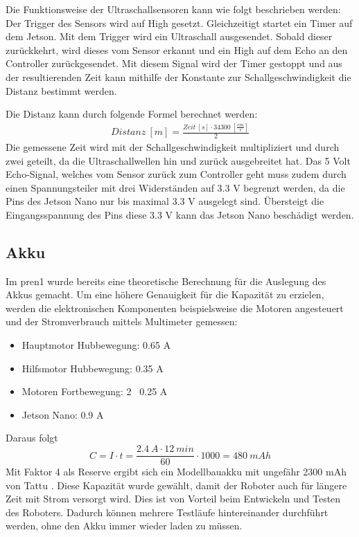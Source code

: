 Die Funktionsweise der Ultraschallsensoren kann wie folgt beschrieben werden:
Der Trigger des Sensors wird auf High gesetzt. Gleichzeitigt startet ein Timer auf dem Jetson. Mit dem Trigger wird ein Ultraschall ausgesendet. Sobald dieser zurückkehrt, wird dieses vom Sensor erkannt und ein High auf dem Echo an den Controller zurückgesendet. Mit diesem Signal wird der Timer gestoppt und aus der resultierenden Zeit kann mithilfe der Konstante zur Schallgeschwindigkeit die Distanz bestimmt werden.

Die Distanz kann durch folgende Formel berechnet werden:
\begin{align*}
    Distanz\ [m] = \frac{Zeit\ [s] \cdot 34300\ [\frac{cm}{s}]}{2}
\end{align*}
Die gemessene Zeit wird mit der Schallgeschwindigkeit multipliziert und durch zwei geteilt, da die Ultraschallwellen hin und zurück ausgebreitet hat. 
Das 5 Volt Echo-Signal, welches vom Sensor zurück zum Controller geht muss zudem durch einen Spannungsteiler mit drei Widerständen auf 3.3 V begrenzt werden, da die Pins des Jetson Nano nur bis maximal 3.3 V ausgelegt sind. Übersteigt die Eingangsspannung des Pins diese 3.3 V kann das Jetson Nano beschädigt werden.

\newpage

\subsection{Akku}
Im \acrshort{pren1} wurde bereits eine theoretische Berechnung für die Auslegung des Akkus gemacht. Um eine höhere Genauigkeit für die Kapazität zu erzielen, werden die elektronischen Komponenten beispielsweise die Motoren angesteuert und der Stromverbrauch mittels Multimeter gemessen:
\begin{itemize}
    \item Hauptmotor Hubbewegung: 0.65 A
    \item Hilfsmotor Hubbewegung: 0.35 A
    \item Motoren Fortbewegung: 2 \cdot\ 0.25 A
    \item Jetson Nano: 0.9 A
\end{itemize}
Daraus folgt 
\[C = {I\cdot t} = \frac{2.4\ A\cdot 12\ min}{60} \cdot 1000 = 480\ mAh\]
Mit Faktor 4 als Reserve ergibt sich ein Modellbauakku mit ungefähr 2300 mAh von Tattu \cite{Akku-Modellbau}. Diese Kapazität wurde gewählt, damit der Roboter auch für längere Zeit mit Strom versorgt wird. Dies ist von Vorteil beim Entwickeln und Testen des Roboters. Dadurch können mehrere Testläufe hintereinander durchführt werden, ohne den Akku immer wieder laden zu müssen.

